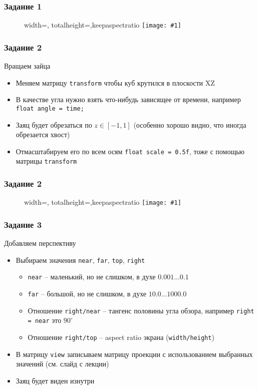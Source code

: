 \documentclass{beamer}
\newcommand{\slideimage}[1]{
  \begin{figure}
    \begin{adjustbox}{width=\textwidth, totalheight=\textheight-2\baselineskip-2\baselineskip,keepaspectratio}
      \texttt{[image: \#1]}
    \end{adjustbox}
  \end{figure}
}
\begin{document}
\begin{frame}[fragile]
\frametitle{Задание 1}
\slideimage{1.png}
\end{frame}

\begin{frame}[fragile]
\frametitle{Задание 2}
Вращаем зайца
\begin{itemize}
\item Меняем матрицу \verb|transform| чтобы куб крутился в плоскости XZ
\item В качестве угла нужно взять что-нибудь зависящее от времени, например \verb|float angle = time;|
\item Заяц будет обрезаться по \begin{math}z \in [-1, 1]\end{math} (особенно хорошо видно, что иногда обрезается хвост)
\item Отмасштабируем его по всем осям \verb|float scale = 0.5f|, тоже с помощью матрицы \verb|transform|
\end{itemize}
\end{frame}

\begin{frame}[fragile]
\frametitle{Задание 2}
\slideimage{2.png}
\end{frame}

\begin{frame}[fragile]
\frametitle{Задание 3}
Добавляем перспективу
\begin{itemize}
\item Выбираем значения \verb|near|, \verb|far|, \verb|top|, \verb|right|
\begin{itemize}
\item \verb|near| -- маленький, но не слишком, в духе \begin{math}0.001 \dots 0.1\end{math}
\item \verb|far| -- большой, но не слишком, в духе \begin{math}10.0 \dots 1000.0\end{math}
\item Отношение \verb|right/near| -- тангенс половины угла обзора, например \verb|right = near| это \begin{math}90^\circ\end{math}
\item Отношение \verb|right/top| -- aspect ratio экрана (\verb|width/height|)
\end{itemize}
\item В матрицу \verb|view| записываем матрицу проекции с использованием выбранных значений (см. слайд с лекции)
\item Заяц будет виден изнутри
\end{itemize}
\end{frame}
\end{document}

